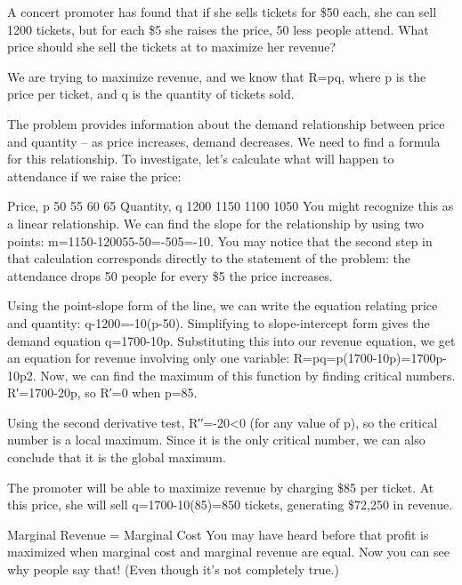 \begin{example}
A concert promoter has found that if she sells tickets for \$50 each, she can sell 1200 tickets, but for each \$5 she raises the price, 50 less people attend. What price should she sell the tickets at to maximize her revenue?

\begin{solution} We are trying to maximize revenue, and we know that R=pq, where p is the price per ticket, and q is the quantity of tickets sold.

The problem provides information about the demand relationship between price and quantity – as price increases, demand decreases. We need to find a formula for this relationship. To investigate, let's calculate what will happen to attendance if we raise the price:

Price, p	50	55	60	65	Quantity, q	1200	1150	1100	1050
You might recognize this as a linear relationship. We can find the slope for the relationship by using two points:
m=1150-120055-50=-505=-10.
You may notice that the second step in that calculation corresponds directly to the statement of the problem: the attendance drops 50 people for every \$5 the price increases.

Using the point-slope form of the line, we can write the equation relating price and quantity:
q-1200=-10(p-50).
Simplifying to slope-intercept form gives the demand equation
q=1700-10p.
Substituting this into our revenue equation, we get an equation for revenue involving only one variable:
R=pq=p(1700-10p)=1700p-10p2.
Now, we can find the maximum of this function by finding critical numbers. R′=1700-20p, so R′=0 when p=85.

Using the second derivative test, R′′=-20<0 (for any value of p), so the critical number is a local maximum. Since it is the only critical number, we can also conclude that it is the global maximum.

The promoter will be able to maximize revenue by charging \$85 per ticket. At this price, she will sell q=1700-10(85)=850 tickets, generating \$72,250 in revenue.
\end{solution}\end{example}

Marginal Revenue = Marginal Cost
You may have heard before that profit is maximized when marginal cost and marginal revenue are equal. Now you can see why people say that! (Even though it’s not completely true.)


